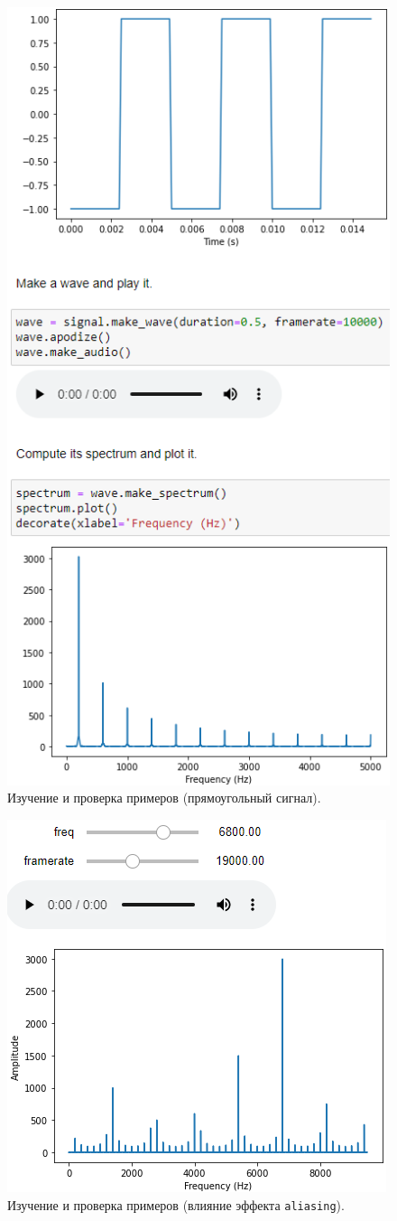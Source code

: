 \documentclass[a4paper, 14pt]{extarticle}
\begin{document}
    \begin{figure}[H]
        \centering
        \includegraphics[width=0.6\linewidth]{resources/Images/task1_check_square}
        \caption{Изучение и проверка примеров (прямоугольный сигнал).}
        \label{fig:task1_check_square}
    \end{figure}

    \begin{figure}[H]
        \centering
        \includegraphics[width=0.8\linewidth]{resources/Images/task1_check_aliasing}
        \caption{Изучение и проверка примеров (влияние эффекта \texttt{aliasing}).}
        \label{fig:task1_check_aliasing}
    \end{figure}
\end{document}

